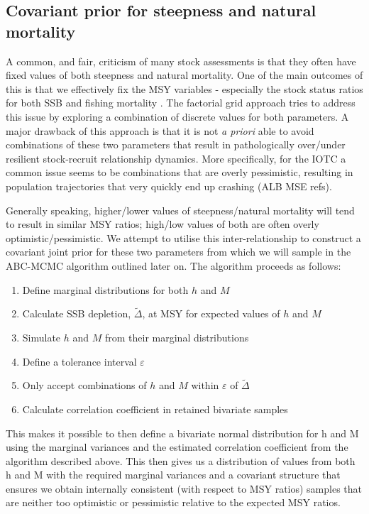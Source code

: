 \documentclass[11pt]{article}
\newcommand{\veps}{\varepsilon}
\begin{document}
\subsection{Covariant prior for steepness and natural mortality}

A common, and fair, criticism of many stock assessments is that they often have fixed values of both steepness and natural mortality. One of the main outcomes of this is that we effectively fix the MSY variables - especially the stock status ratios for both SSB and fishing mortality \cite{steepm}. The factorial grid approach tries to address this issue by exploring a combination of discrete values for both parameters. A major drawback of this approach is that it is not \textit{a priori} able to avoid combinations of these two parameters that result in pathologically over/under resilient stock-recruit relationship dynamics. More specifically, for the IOTC a common issue seems to be combinations that are overly pessimistic, resulting in population trajectories that very quickly end up crashing (ALB MSE refs).

Generally speaking, higher/lower values of steepness/natural mortality will tend to result in similar MSY ratios; high/low values of both are often overly optimistic/pessimistic. We attempt to utilise this inter-relationship to construct a covariant joint prior for these two parameters from which we will sample in the ABC-MCMC algorithm outlined later on. The algorithm proceeds as follows:

\begin{enumerate}
    \item Define marginal distributions for both $h$ and $M$
    \item Calculate SSB depletion, $\tilde{\Delta}$, at MSY for expected values of $h$ and $M$
    \item Simulate $h$ and $M$ from their marginal distributions
    \item Define a tolerance interval $\veps$
    \item Only accept combinations of $h$ and $M$ within $\veps$ of $\tilde{\Delta}$
    \item Calculate correlation coefficient in retained bivariate samples
\end{enumerate}

This makes it possible to then define a bivariate normal distribution for h and M using the marginal variances and the estimated correlation coefficient from the algorithm described above. This then gives us a distribution of values from both h and M with the required marginal variances and a covariant structure that ensures we obtain internally consistent (with respect to MSY ratios) samples that are neither too optimistic or pessimistic relative to the expected MSY ratios.
\end{document}

